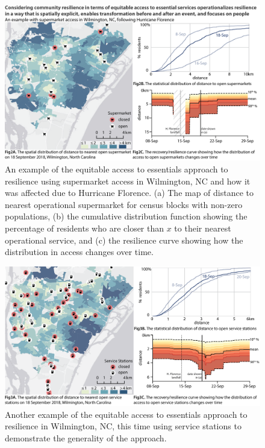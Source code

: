 \documentclass[onecolumn,doublespacing]{risa}
\begin{document}
\begin{figure}
    \centering
    \includegraphics[width=\linewidth]{report/fig/NC_supermarket_resilience.png}
    \caption{An example of the equitable access to essentials approach to resilience using supermarket access in Wilmington, NC and how it was affected due to Hurricane Florence. (a) The map of distance to nearest operational supermarket for census blocks with non-zero populations, (b) the cumulative distribution function showing the percentage of residents who are closer than $x$ to their nearest operational service, and (c) the resilience curve showing how the distribution in access changes over time.
    }
    \label{fig:NC_resil_super}
\end{figure}
\begin{figure}
    \centering
    \includegraphics[width=\linewidth]{report/fig/NC_gasstation_resilience.png}
    \caption{Another example of the equitable access to essentials approach to resilience in Wilmington, NC, this time using service stations to demonstrate the generality of the approach.}
    \label{fig:NC_resil_gas}
\end{figure}
\end{document}
